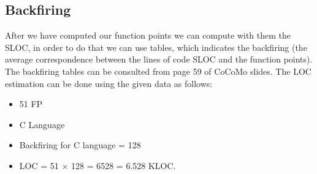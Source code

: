 \documentclass[11pt]{article}
\begin{document}
\subsection{Backfiring}
After we have computed our function points we can compute with them the SLOC, in order to do that we can use tables, which indicates the backfiring (the average correspondence between the lines of code SLOC and the function points). The backfiring tables can be consulted from page 59 of CoCoMo slides.
The LOC estimation can be done using the given data as follows:
\begin{itemize}
\item 51 FP
\item C Language
\item Backfiring for C language = 128
\item LOC = 51 × 128 = 6528 = 6.528 KLOC.
\end{itemize}
\end{document}
